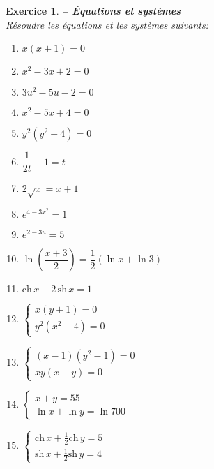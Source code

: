 \documentclass[a4paper,11pt]{article}
\newcommand{\ch}{\mathrm{ch}\,}
\newcommand{\sh}{\mathrm{sh}\,}
\newenvironment{alphate}{\begin{enumerate}[label=\alph*)]}{\end{enumerate}}
\newtheorem{exo}{Exercice}
\newenvironment{exercice}{\begin{exo} \em}{\end{exo}}
\begin{document}
\begin{exercice} {\bf -- \'Equations et syst\`emes} \\ 
R\'esoudre les \'equations et les syst\`emes suivants:
\begin{multicols}{3}
\begin{alphate}
\item $x(x+1)=0$ \smallskip 
\item $x^2-3x+2 = 0$ \smallskip 
\item $3u^2-5u-2 = 0$ \smallskip 
\item $x^2-5x+4=0$ \smallskip  
\item $y^2(y^2-4)=0$ \smallskip 
\item $\dfrac{1}{2t}-1 = t$ \smallskip 
\item $ 2\sqrt{x}= x+1 $
\item $e^{4-3x^2} = 1$ \smallskip 
\item $e^{2-3u} = 5$ \smallskip 
\item $\ln\left(\dfrac{x+3}{2}\right)=\dfrac{1}{2}(\ln x+\ln 3)$ \smallskip 
\item $\ch x + 2\, \sh x = 1$ \smallskip
\item $\left\{\begin{array}{l} x(y+1)=0 \\ y^2(x^2-4)=0 \end{array}\right.$ \smallskip 
\item $\left\{\begin{array}{l} (x-1)(y^2-1)=0 \\ xy(x-y)=0 \end{array}\right.$ \smallskip 
\item $\left\{\begin{array}{l} x+y=55 \\ \ln x +\ln y=\ln 700 \end{array}\right.$ \smallskip 
\item $\left\{\begin{array}{l} \ch x+\frac{1}{2}\ch y=5 \\ \sh x+\frac{1}{2}\sh y=4 \end{array}\right.$ \smallskip 
\end{alphate}
\end{multicols}
\end{exercice}
\bigskip
\end{document}
